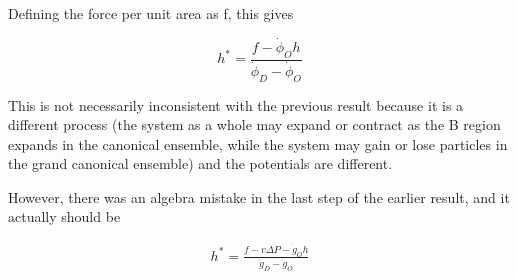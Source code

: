 \documentclass[11pt, oneside]{article}   	%
\begin{document}
Defining the force per unit area as f, this gives

\begin{equation}
h^*=\frac{f-\dot{\phi}_Oh}{\dot{\phi}_D-\dot{\phi}_O}
\end{equation}

This is not necessarily inconsistent with the previous result because it is a different process (the system as a whole may expand or contract as the B region expands in the canonical ensemble, while the system may gain or lose particles in the grand canonical ensemble) and the potentials are different.

However, there was an algebra mistake in the last step of the earlier result, and it actually should be

\begin{gather}
h^*= \frac{f-v\Delta P-\dot{g}_Oh}{\dot{g}_D-\dot{g}_O}
\end{gather}
\end{document}
